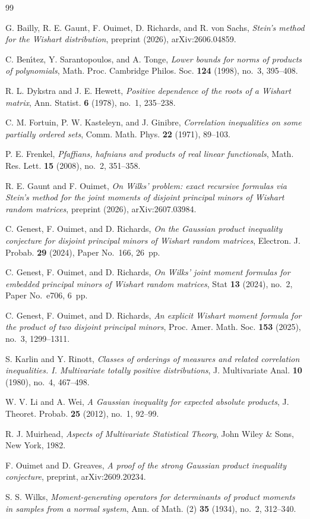 \documentclass{amsart}
\theoremstyle{definition}
\theoremstyle{remark}
\numberwithin{equation}{section}
\begin{document}
\begin{thebibliography}{99}

G. Bailly, R. E. Gaunt, F. Ouimet, D. Richards, and R. von Sachs, \emph{Stein's method for the Wishart distribution}, preprint (2026), arXiv:2606.04859.

C. Ben\'{\i}tez, Y. Sarantopoulos, and A. Tonge, \emph{Lower bounds for norms of products of polynomials}, Math. Proc. Cambridge Philos. Soc. \textbf{124} (1998), no.~3, 395--408.

R. L. Dykstra and J. E. Hewett, \emph{Positive dependence of the roots of a Wishart matrix}, Ann. Statist. \textbf{6} (1978), no.~1, 235--238.

C. M. Fortuin, P. W. Kasteleyn, and J. Ginibre, \emph{Correlation inequalities on some partially ordered sets}, Comm. Math. Phys. \textbf{22} (1971), 89--103.

P. E. Frenkel, \emph{Pfaffians, hafnians and products of real linear functionals}, Math. Res. Lett. \textbf{15} (2008), no.~2, 351--358.

R. E. Gaunt and F. Ouimet, \emph{On Wilks' problem: exact recursive formulas via Stein's method for the joint moments of disjoint principal minors of Wishart random matrices}, preprint (2026), arXiv:2607.03984.

C. Genest, F. Ouimet, and D. Richards, \emph{On the Gaussian product inequality conjecture for disjoint principal minors of Wishart random matrices}, Electron. J. Probab. \textbf{29} (2024), Paper No.~166, 26~pp.

C. Genest, F. Ouimet, and D. Richards, \emph{On Wilks' joint moment formulas for embedded principal minors of Wishart random matrices}, Stat \textbf{13} (2024), no.~2, Paper No.~e706, 6~pp.

C. Genest, F. Ouimet, and D. Richards, \emph{An explicit Wishart moment formula for the product of two disjoint principal minors}, Proc. Amer. Math. Soc. \textbf{153} (2025), no.~3, 1299--1311.

S. Karlin and Y. Rinott, \emph{Classes of orderings of measures and related correlation inequalities. I. Multivariate totally positive distributions}, J. Multivariate Anal. \textbf{10} (1980), no.~4, 467--498.

W. V. Li and A. Wei, \emph{A Gaussian inequality for expected absolute products}, J. Theoret. Probab. \textbf{25} (2012), no.~1, 92--99.

R. J. Muirhead, \emph{Aspects of Multivariate Statistical Theory}, John Wiley \& Sons, New York, 1982.

F. Ouimet and D. Greaves, \emph{A proof of the strong Gaussian product inequality conjecture}, preprint, arXiv:2609.20234.

S. S. Wilks, \emph{Moment-generating operators for determinants of product moments in samples from a normal system}, Ann. of Math. (2) \textbf{35} (1934), no.~2, 312--340.

\end{thebibliography}
\end{document}
